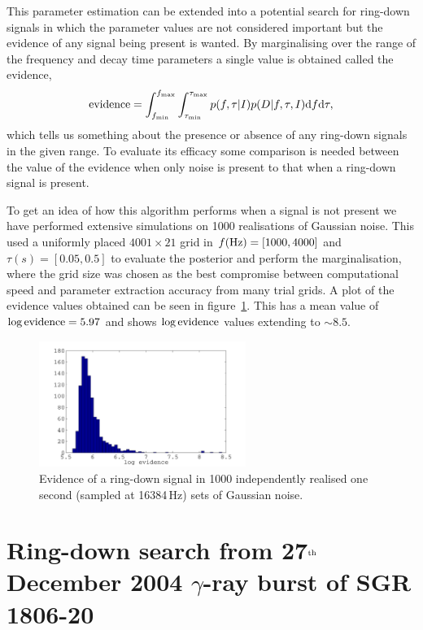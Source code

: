 This parameter estimation can be extended into a potential search for ring-down signals in which the
parameter values are not considered important but the evidence of any signal being present is
wanted. By marginalising over the range of the frequency and decay time parameters a single value is
obtained called the evidence,
\begin{equation}
{\rm evidence} = \int_{f_{\rm min}}^{f_{\rm max}}\int_{\tau_{\rm min}}^{\tau_{\rm max}} p(f,
\tau|I)p(D|f,\tau,I) {\rm d}f{\rm d}\tau, 
\end{equation}
which tells us something about the presence or absence of any ring-down signals in the given range.
To evaluate its efficacy some comparison is needed between the value of the evidence when only noise
is present to that when a ring-down signal is present. 

To get an idea of how this algorithm performs when a signal is not present we have performed
extensive simulations on 1000 realisations of Gaussian noise. This used a uniformly placed
$4001\times21$ grid in $f({\rm Hz}) = [1000, 4000]$ and $\tau(s) = [0.05, 0.5]$ to evaluate
the posterior and perform the marginalisation, where the grid size was chosen as the best
compromise between computational speed and parameter extraction accuracy from many trial grids. A
plot of the evidence values obtained can be seen in figure~\ref{evidenceNoise}. This has a mean
value of $\log{\rm evidence} = 5.97$ and shows $\log{\rm evidence}$ values extending to $\sim 8.5$.
\begin{figure}[!htbp]
\begin{center}
\includegraphics[width=0.6\textwidth]{figs/evidenceNoise}\caption[Evidence of a ring-down
signal in Gaussian noise.]{Evidence of a ring-down signal in 1000 independently realised one second
(sampled at 16384\,Hz) sets of Gaussian noise.}\label{evidenceNoise}
\end{center}
\end{figure}

\section{Ring-down search from 27$^{\rm th}$ December 2004 $\gamma$-ray burst of SGR\,1806-20}
